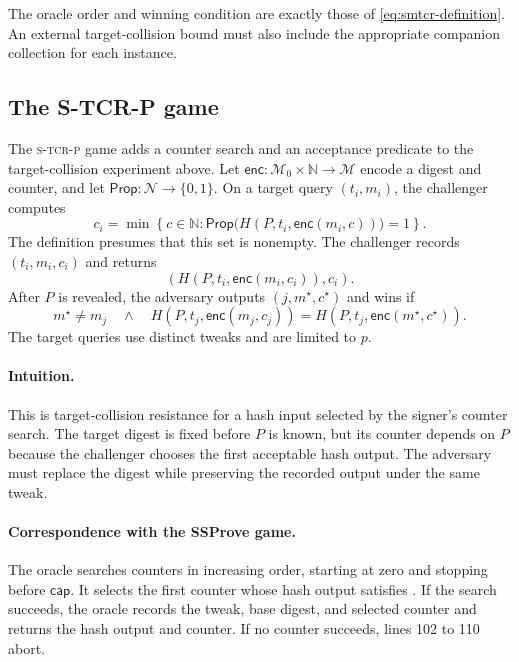 \documentclass[11pt,a4paper]{article}
\theoremstyle{plain}
\theoremstyle{definition}
\DeclareRobustCommand{\coq}[1]{\texttt{\detokenize{#1}}}
\newcommand{\SSProve}{\textsf{SSProve}\xspace}
\newcommand{\stcrp}{\textsc{s-tcr-p}\xspace}
\begin{document}
The oracle order and winning condition are exactly those of \eqref{eq:smtcr-definition}.
An external target-collision bound must also include the appropriate companion collection for each instance.

\subsection{The S-TCR-P game}

The \stcrp game adds a counter search and an acceptance predicate to the target-collision experiment above.
Let \(\mathsf{enc}:\mathcal M_0\times\mathbb N\to\mathcal M\) encode a digest and counter, and let \(\mathsf{Prop}:\mathcal N\to\{0,1\}\).
On a target query \((t_i,m_i)\), the challenger computes
\[
  c_i=\min\left\{c\in\mathbb N:\mathsf{Prop}\bigl(H(P,t_i,\mathsf{enc}(m_i,c))\bigr)=1\right\}.
\]
The definition presumes that this set is nonempty.
The challenger records \((t_i,m_i,c_i)\) and returns
\[
  \left(H(P,t_i,\mathsf{enc}(m_i,c_i)),c_i\right).
\]
After \(P\) is revealed, the adversary outputs \((j,m^\star,c^\star)\) and wins if
\begin{equation}
\label{eq:stcrp-definition}
  m^\star\ne m_j
  \quad\land\quad
  H(P,t_j,\mathsf{enc}(m_j,c_j))
  =H(P,t_j,\mathsf{enc}(m^\star,c^\star)).
\end{equation}
The target queries use distinct tweaks and are limited to \(p\).

\paragraph{Intuition.}
This is target-collision resistance for a hash input selected by the signer's counter search.
The target digest is fixed before \(P\) is known, but its counter depends on \(P\) because the challenger chooses the first acceptable hash output.
The adversary must replace the digest while preserving the recorded output under the same tweak.



\paragraph{Correspondence with the \SSProve game.}
The oracle \coq{SQUERY} searches counters in increasing order, starting at zero and stopping before \(\mathsf{cap}\).
It selects the first counter whose hash output satisfies \coq{prp}.
If the search succeeds, the oracle records the tweak, base digest, and selected counter and returns the hash output and counter.
If no counter succeeds, lines 102 to 110 abort.
\end{document}
